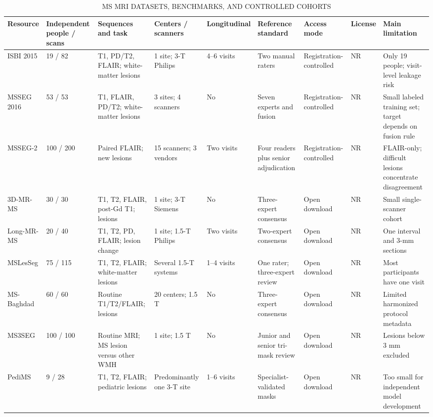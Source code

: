 \documentclass[journal,twoside,web]{ieeecolor}
\begin{document}
\begin{table}[!t]
\centering
\caption{MS MRI DATASETS, BENCHMARKS, AND CONTROLLED COHORTS}
\label{tab:2}
\scriptsize
\setlength{\tabcolsep}{2.2pt}
\renewcommand{\arraystretch}{1.10}
\begin{tabularx}{\textwidth}{@{}ZZZZZZZZZ@{}}
\toprule
\textbf{Resource} & \textbf{Independent people / scans} & \textbf{Sequences and task} & \textbf{Centers / scanners} & \textbf{Longitudinal} & \textbf{Reference standard} & \textbf{Access mode} & \textbf{License} & \textbf{Main limitation} \\
\midrule
ISBI 2015 \cite{carass2017,carass_data} & 19 / 82 & T1, PD/T2, FLAIR; white-matter lesions & 1 site; 3-T Philips & 4--6 visits & Two manual raters & Registration-controlled & NR & Only 19 people; visit-level leakage risk \\
MSSEG 2016 \cite{msseg_descriptor,msseg_challenge} & 53 / 53 & T1, FLAIR, PD/T2; white-matter lesions & 3 sites; 4 scanners & No & Seven experts and fusion & Registration-controlled & NR & Small labeled training set; target depends on fusion rule \\
MSSEG-2 \cite{msseg2} & 100 / 200 & Paired FLAIR; new lesions & 15 scanners; 3 vendors & Two visits & Four readers plus senior adjudication & Registration-controlled & NR & FLAIR-only; difficult lesions concentrate disagreement \\
3D-MR-MS \cite{lesjak3d} & 30 / 30 & T1, T2, FLAIR, post-Gd T1; lesions & 1 site; 3-T Siemens & No & Three-expert consensus & Open download & NR & Small single-scanner cohort \\
Long-MR-MS \cite{lesjaklong} & 20 / 40 & T1, T2, PD, FLAIR; lesion change & 1 site; 1.5-T Philips & Two visits & Two-expert consensus & Open download & NR & One interval and 3-mm sections \\
MSLesSeg \cite{mslesseg} & 75 / 115 & T1, T2, FLAIR; white-matter lesions & Several 1.5-T systems & 1--4 visits & One rater; three-expert review & Open download & NR & Most participants have one visit \\
MS-Baghdad \cite{msbaghdad} & 60 / 60 & Routine T1/T2/FLAIR; lesions & 20 centers; 1.5 T & No & Three-expert consensus & Open download & NR & Limited harmonized protocol metadata \\
MS3SEG \cite{ms3seg} & 100 / 100 & Routine MRI; MS lesion versus other WMH & 1 site; 1.5 T & No & Junior and senior tri-mask review & Open download & NR & Lesions below 3 mm excluded \\
PediMS \cite{pedims} & 9 / 28 & T1, T2, FLAIR; pediatric lesions & Predominantly one 3-T site & 1--6 visits & Specialist-validated masks & Open download & NR & Too small for independent model development \\

\end{tabularx}
\end{table}
\end{document}
